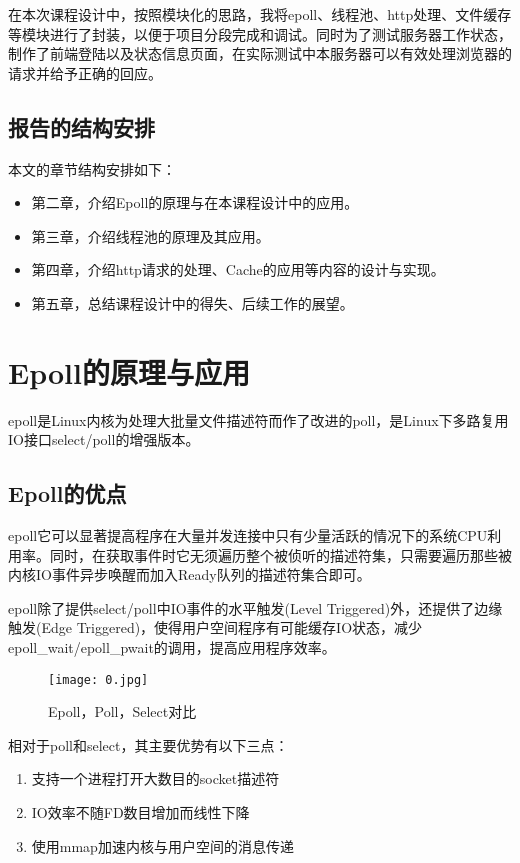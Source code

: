 \documentclass[bachelor]{thesis-uestc}
\begin{document}
在本次课程设计中，按照模块化的思路，我将epoll、线程池、http处理、文件缓存等模块进行了封装，以便于项目分段完成和调试。同时为了测试服务器工作状态，制作了前端登陆以及状态信息页面，在实际测试中本服务器可以有效处理浏览器的请求并给予正确的回应。

\section{报告的结构安排}
本文的章节结构安排如下：

\begin{itemize}
	\item 第二章，介绍Epoll的原理与在本课程设计中的应用。
	\item 第三章，介绍线程池的原理及其应用。
	\item 第四章，介绍http请求的处理、Cache的应用等内容的设计与实现。
	\item 第五章，总结课程设计中的得失、后续工作的展望。
\end{itemize}

\chapter{Epoll的原理与应用}

epoll是Linux内核为处理大批量文件描述符而作了改进的poll，是Linux下多路复用IO接口select/poll的增强版本。

\section{Epoll的优点}
epoll它可以显著提高程序在大量并发连接中只有少量活跃的情况下的系统CPU利用率。同时，在获取事件时它无须遍历整个被侦听的描述符集，只需要遍历那些被内核IO事件异步唤醒而加入Ready队列的描述符集合即可。

epoll除了提供select/poll中IO事件的水平触发(Level Triggered)外，还提供了边缘触发(Edge Triggered)，使得用户空间程序有可能缓存IO状态，减少epoll\_wait/epoll\_pwait的调用，提高应用程序效率。

\begin{figure}[h]
\texttt{[image: 0.jpg]}
\caption{Epoll，Poll，Select对比}
\label{0} 
\end{figure}

相对于poll和select，其主要优势有以下三点：
\begin{enumerate}
	\item 支持一个进程打开大数目的socket描述符
	\item IO效率不随FD数目增加而线性下降
	\item 使用mmap加速内核与用户空间的消息传递
\end{enumerate}
\end{document}
